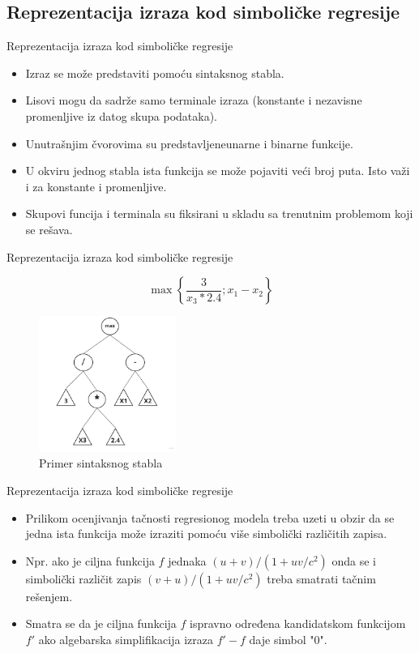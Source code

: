 \documentclass{beamer}
\begin{document}
\subsection{Reprezentacija izraza kod simboličke regresije}
\begin{frame}{Reprezentacija izraza kod simboličke regresije}
\begin{itemize}
    \item Izraz se može predstaviti pomoću sintaksnog stabla.
    \item Lisovi mogu da sadrže samo terminale izraza (konstante i nezavisne promenljive iz datog skupa podataka).
    \item Unutrašnjim čvorovima su predstavljeneunarne i binarne funkcije.
    \item U okviru jednog stabla ista funkcija se može pojaviti veći broj puta. Isto važi i za konstante i promenljive.
    \item Skupovi funcija i terminala su fiksirani u skladu sa trenutnim
problemom koji se rešava.
\end{itemize}
\end{frame}


\begin{frame}{Reprezentacija izraza kod simboličke regresije}

\[ \max \left\{\frac{3}{x_{3} * 2.4} ; x_{1}-x_{2}\right\} \]

\begin{figure}[!ht]
\begin{center}
\includegraphics[width=0.4\textwidth]{images/syntax_tree.jpg}
\end{center}
\caption{Primer sintaksnog stabla}
\label{fig:syntaxTree1}
\end{figure}
\end{frame}


\begin{frame}{Reprezentacija izraza kod simboličke regresije}
\begin{itemize}
    \item Prilikom ocenjivanja tačnosti regresionog modela treba uzeti u obzir da se jedna ista funkcija može izraziti pomoću više simbolički različitih zapisa.
    \item Npr. ako je ciljna funkcija $f$ jednaka $(u + v) / (1 + uv/c^{2})$ onda se i simbolički različit zapis $(v + u) / (1 + uv/c^{2})$ treba smatrati tačnim rešenjem.
    \item Smatra se da je ciljna funkcija $f$ ispravno određena kandidatskom funkcijom $f'$ ako algebarska simplifikacija izraza $f' - f$ daje simbol "0".
\end{itemize}
\end{frame}
\end{document}
